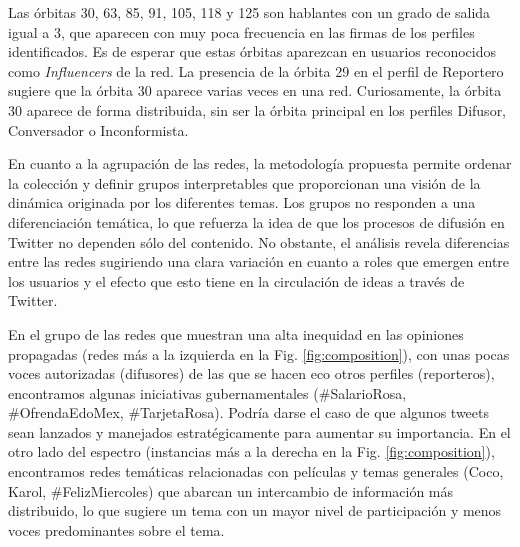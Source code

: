 Las órbitas 30, 63, 85, 91, 105, 118 y 125 son hablantes con un grado de salida igual a 3, que aparecen con muy poca frecuencia en las firmas de los perfiles identificados. Es de esperar que estas órbitas aparezcan en usuarios reconocidos como \textit{Influencers} de la red. La presencia de la órbita 29 en el perfil de Reportero sugiere que la órbita 30 aparece varias veces en una red. Curiosamente, la órbita 30 aparece de forma distribuida, sin ser la órbita principal en los perfiles Difusor, Conversador o Inconformista.

En cuanto a la agrupación de las redes, la metodología propuesta permite ordenar la colección y definir grupos interpretables que proporcionan una visión de la dinámica originada por los diferentes temas. Los grupos no responden a una diferenciación temática, lo que refuerza la idea de que los procesos de difusión en Twitter no dependen sólo del contenido. No obstante, el análisis revela diferencias entre las redes sugiriendo una clara variación en cuanto a roles que emergen entre los usuarios y el efecto que esto tiene en la circulación de ideas a través de Twitter. 

En el grupo de las redes que muestran una alta inequidad en las opiniones propagadas (redes más a la izquierda en la Fig. \ref{fig:composition}), con unas pocas voces autorizadas (difusores) de las que se hacen eco otros perfiles (reporteros), encontramos algunas iniciativas gubernamentales (\#SalarioRosa, \#OfrendaEdoMex, \#TarjetaRosa). Podría darse el caso de que algunos tweets sean lanzados y manejados estratégicamente para aumentar su importancia. En el otro lado del espectro (instancias más a la derecha en la Fig. \ref{fig:composition}), encontramos redes temáticas relacionadas con películas y temas generales (Coco, Karol, \#FelizMiercoles) que abarcan un intercambio de información más distribuido, lo que sugiere un tema con un mayor nivel de participación y menos voces predominantes sobre el tema. 

